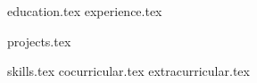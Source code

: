 \documentclass[11pt, a4paper]{awesome-cv}
\newcommand*{\sectiondir}{resume/}
\begin{document}
\makecvheader

{education.tex}
{experience.tex}

{projects.tex}

{skills.tex}
{cocurricular.tex}
{extracurricular.tex}


\end{document}
